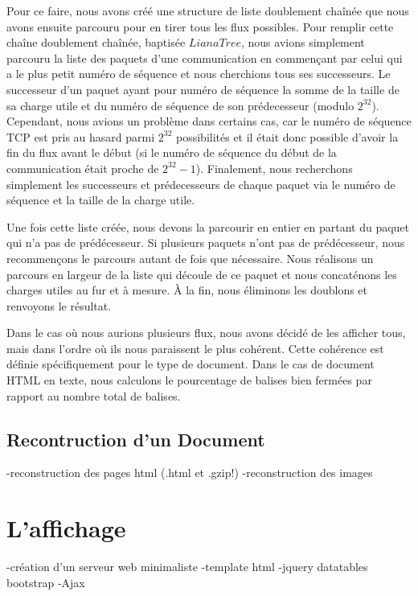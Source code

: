 \indent Pour ce faire, nous avons créé une structure de liste doublement chaînée que nous avons ensuite parcouru pour en tirer tous les flux possibles. Pour remplir cette chaîne
doublement chaînée, baptisée $LianaTree$, nous avions simplement parcouru la liste des paquets d'une communication en commençant par celui qui a le plus petit numéro de séquence et 
nous cherchions tous ses successeurs. Le successeur d'un paquet ayant pour numéro de séquence la somme de la taille de sa charge utile et du numéro de séquence de son prédecesseur 
(modulo $2^{32}$).
Cependant, nous avions un problème dans certains cas, car le numéro de séquence TCP est pris au hasard parmi $2^{32}$ possibilités et il était donc possible d'avoir la fin du flux 
avant le début (si le numéro de séquence du début de la communication était proche de $2^{32} -1$). Finalement, nous recherchons simplement les successeurs et prédecesseurs de chaque
paquet via le numéro de séquence et la taille de la charge utile.

Une fois cette liste créée, nous devons la parcourir en entier en partant du paquet qui n'a pas de prédécesseur. Si plusieurs paquets n'ont pas de prédécesseur, nous recommençons le parcours autant de fois que nécessaire. Nous réalisons un parcours en largeur de la liste qui découle de ce paquet et nous concaténons les charges utiles au fur et à mesure. À la fin, nous éliminons
 les doublons et renvoyons le résultat.



Dans le cas où nous aurions plusieurs flux, nous avons décidé de les afficher tous, mais dans l'ordre où ils nous paraissent le plus cohérent. Cette cohérence est définie spécifiquement 
pour le type de document. Dans le cas de document HTML en texte, nous calculons le pourcentage de balises bien fermées par rapport au nombre total de balises.

\subsection{Recontruction d'un Document}

-reconstruction des pages html (.html et .gzip!)
-reconstruction des images

\section{L'affichage}
-création d'un serveur web minimaliste
-template html
-jquery datatables bootstrap
-Ajax

